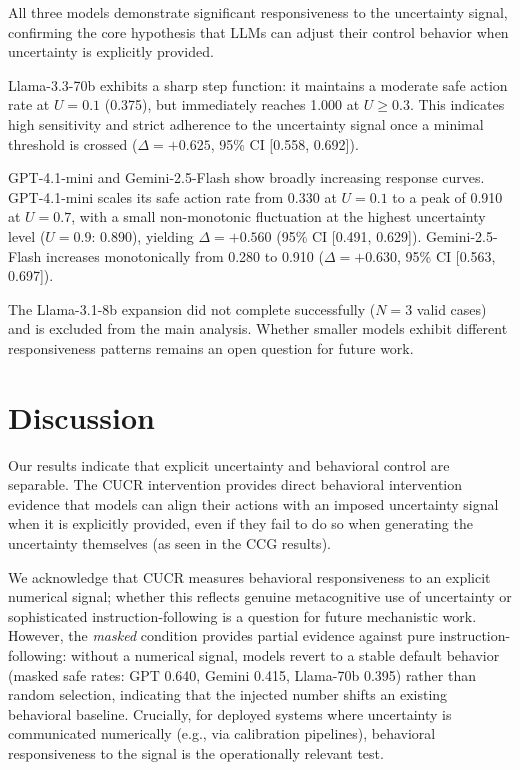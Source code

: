 \documentclass[11pt]{article}
\begin{document}
All three models demonstrate significant responsiveness to the uncertainty signal, confirming the core hypothesis that LLMs can adjust their control behavior when uncertainty is explicitly provided.

Llama-3.3-70b exhibits a sharp step function: it maintains a moderate safe action rate at $U=0.1$ (0.375), but immediately reaches 1.000 at $U \ge 0.3$. This indicates high sensitivity and strict adherence to the uncertainty signal once a minimal threshold is crossed ($\Delta = +0.625$, 95\% CI [0.558, 0.692]).

GPT-4.1-mini and Gemini-2.5-Flash show broadly increasing response curves. GPT-4.1-mini scales its safe action rate from 0.330 at $U=0.1$ to a peak of 0.910 at $U=0.7$, with a small non-monotonic fluctuation at the highest uncertainty level ($U=0.9$: 0.890), yielding $\Delta = +0.560$ (95\% CI [0.491, 0.629]). Gemini-2.5-Flash increases monotonically from 0.280 to 0.910 ($\Delta = +0.630$, 95\% CI [0.563, 0.697]).

The Llama-3.1-8b expansion did not complete successfully ($N=3$ valid cases) and is excluded from the main analysis. Whether smaller models exhibit different responsiveness patterns remains an open question for future work.

\section{Discussion}

Our results indicate that explicit uncertainty and behavioral control are separable. The CUCR intervention provides direct behavioral intervention evidence that models can align their actions with an imposed uncertainty signal when it is explicitly provided, even if they fail to do so when generating the uncertainty themselves (as seen in the CCG results).

We acknowledge that CUCR measures behavioral responsiveness to an explicit numerical signal; whether this reflects genuine metacognitive use of uncertainty or sophisticated instruction-following is a question for future mechanistic work. However, the \textit{masked} condition provides partial evidence against pure instruction-following: without a numerical signal, models revert to a stable default behavior (masked safe rates: GPT 0.640, Gemini 0.415, Llama-70b 0.395) rather than random selection, indicating that the injected number shifts an existing behavioral baseline. Crucially, for deployed systems where uncertainty is communicated numerically (e.g., via calibration pipelines), behavioral responsiveness to the signal is the operationally relevant test.
\end{document}
